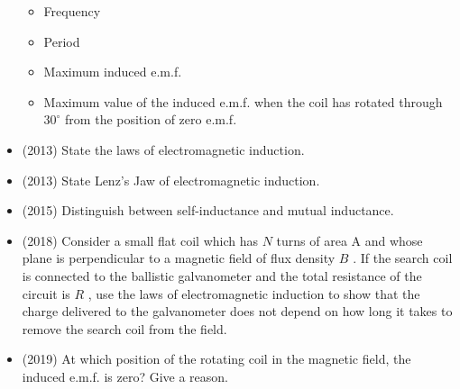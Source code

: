 \documentclass{article}
\begin{document}
\begin{itemize}
 \begin{itemize}
\item Frequency
\item Period
\item Maximum induced e.m.f.
\item Maximum value of the induced e.m.f. when the coil has rotated through $ 30^{\circ}$ from the position of zero e.m.f.
\end{itemize}
\item (2013)  State the laws of electromagnetic induction.
\item (2013)  State Lenz’s Jaw of electromagnetic induction.
\item (2015)  Distinguish between self-inductance and mutual inductance.
\item (2018)  Consider a small flat coil which has $ N$ turns of area A and whose plane is perpendicular to a magnetic field of flux density $ B$ . If the search coil is connected to the ballistic galvanometer and the total resistance of the circuit is $ R$ , use the laws of electromagnetic induction to show that the charge delivered to the galvanometer does not depend on how long it takes to remove the search coil from the field. 
\item (2019)  At which position of the rotating coil in the magnetic field, the induced e.m.f. is zero? Give a reason. 
\end{itemize}
\end{document}
